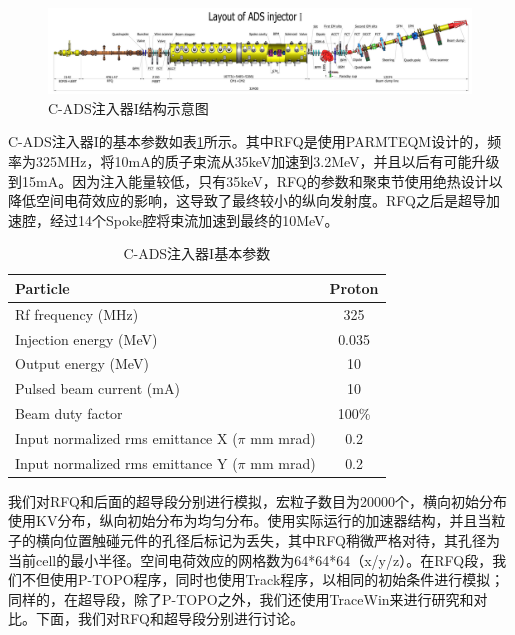 \begin{figure}[!htb]
    \centering
    \includegraphics[width=1.05\textwidth]{Img/Layout_of_ADS_Injector_I.jpg}
    \caption{C-ADS注入器I结构示意图}
    \label{fig:ADS_layout}
\end{figure}

C-ADS注入器I的基本参数如表\ref{tab:C_ADS_parameters}所示。其中RFQ是使用PARMTEQM\cite{crandall1998rfq}设计的，频率为325MHz，将10mA的质子束流从35keV加速到3.2MeV，并且以后有可能升级到15mA。因为注入能量较低，只有35keV，RFQ的参数和聚束节使用绝热设计以降低空间电荷效应的影响，这导致了最终较小的纵向发射度。RFQ之后是超导加速腔，经过14个Spoke腔将束流加速到最终的10MeV。

\begin{table}[!htbp]
    \centering
    \footnotesize%
    \setlength{\tabcolsep}{4pt}%
    \renewcommand{\arraystretch}{1.2}%
    \begin{tabular}{lc}
        \hline\hline
        Particle                & Proton \\
        \hline
        Rf frequency (MHz)      & 325       \\
        \hline
        Injection energy (MeV)  & 0.035     \\
        \hline
        Output energy (MeV)     & 10        \\
        \hline
        Pulsed beam current (mA)& 10        \\
        \hline
        Beam duty factor        & 100\%     \\
        \hline
        Input normalized rms emittance X ($\pi$ mm mrad)    & 0.2        \\
        \hline
        Input normalized rms emittance Y ($\pi$ mm mrad)    & 0.2        \\
        \hline\hline
    \end{tabular}
    \caption{C-ADS注入器I基本参数}
    \label{tab:C_ADS_parameters}
\end{table}

我们对RFQ和后面的超导段分别进行模拟，宏粒子数目为20000个，横向初始分布使用KV分布，纵向初始分布为均匀分布。使用实际运行的加速器结构，并且当粒子的横向位置触碰元件的孔径后标记为丢失，其中RFQ稍微严格对待，其孔径为当前cell的最小半径。空间电荷效应的网格数为64*64*64（x/y/z）。在RFQ段，我们不但使用P-TOPO程序，同时也使用Track程序\cite{aseev2005track}，以相同的初始条件进行模拟；同样的，在超导段，除了P-TOPO之外，我们还使用TraceWin\cite{uriot2014tracewin}来进行研究和对比。下面，我们对RFQ和超导段分别进行讨论。

